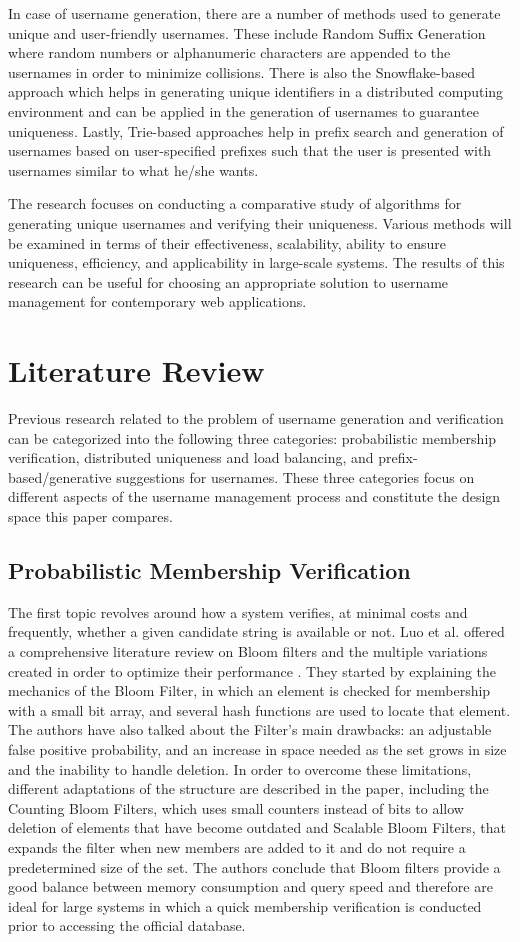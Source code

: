 \documentclass[conference]{IEEEtran}
\begin{document}
In case of username generation, there are a number of methods used to generate unique and user-friendly usernames. These include Random Suffix Generation where random numbers or alphanumeric characters are appended to the usernames in order to minimize collisions. There is also the Snowflake-based approach which helps in generating unique identifiers in a distributed computing environment and can be applied in the generation of usernames to guarantee uniqueness. Lastly, Trie-based approaches help in prefix search and generation of usernames based on user-specified prefixes such that the user is presented with usernames similar to what he/she wants.

The research focuses on conducting a comparative study of algorithms for generating unique usernames and verifying their uniqueness. Various methods will be examined in terms of their effectiveness, scalability, ability to ensure uniqueness, efficiency, and applicability in large-scale systems. The results of this research can be useful for choosing an appropriate solution to username management for contemporary web applications. 

\section{Literature Review}
Previous research related to the problem of username generation and verification can be categorized into the following three categories: probabilistic membership verification, distributed uniqueness and load balancing, and prefix-based/generative suggestions for usernames. These three categories focus on different aspects of the username management process and constitute the design space this paper compares.

\subsection{Probabilistic Membership Verification}
The first topic revolves around how a system verifies, at minimal costs and frequently, whether a given candidate string is available or not. Luo et al. offered a comprehensive literature review on Bloom filters and the multiple variations created in order to optimize their performance \cite{b1}. They started by explaining the mechanics of the Bloom Filter, in which an element is checked for membership with a small bit array, and several hash functions are used to locate that element. The authors have also talked about the Filter's main drawbacks: an adjustable false positive probability, and an increase in space needed as the set grows in size and the inability to handle deletion. In order to overcome these limitations, different
adaptations of the structure are described in the paper, including the
Counting Bloom Filters, which uses small counters instead of bits to allow deletion of elements that have become outdated and Scalable Bloom Filters, that expands the filter when new members are added to it and do not require a predetermined size of the set. The authors conclude that Bloom filters provide a good balance between memory consumption and query speed and therefore are ideal for large systems in which a quick membership verification is conducted prior to accessing the official database.
\end{document}
